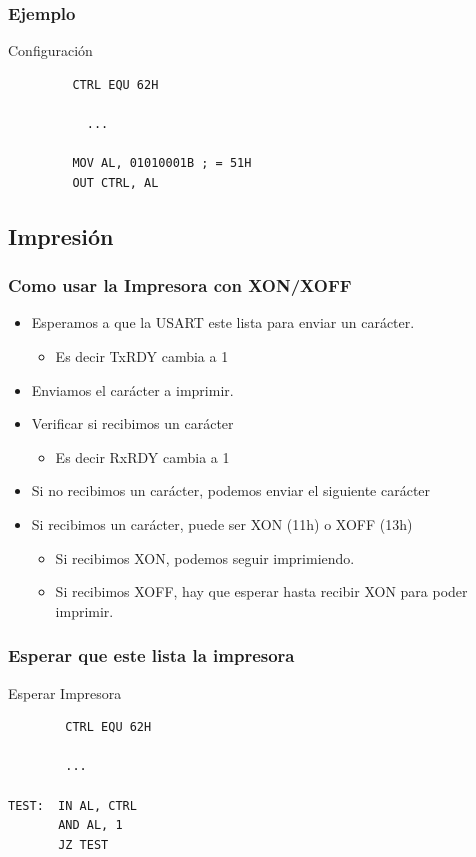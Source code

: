 \documentclass{beamer}
\begin{document}
\begin{frame}[fragile]
\frametitle{Ejemplo}
\begin{block}{Configuración}
 \begin{verbatim}
         CTRL EQU 62H
         
           ...
           
         MOV AL, 01010001B ; = 51H
         OUT CTRL, AL
 \end{verbatim}
\end{block}

\end{frame}

\subsection{Impresión}
\begin{frame}[fragile]
\frametitle{Como usar la Impresora con XON/XOFF}

\begin{itemize}
\item Esperamos a que la USART este lista para enviar un carácter. 
\begin{itemize}
\item Es decir TxRDY cambia a 1 
\end{itemize}
\item Enviamos el carácter a imprimir. 
\item Verificar si recibimos un carácter
\begin{itemize}
 \item Es decir RxRDY cambia a 1
\end{itemize}
\item Si no recibimos un carácter, podemos enviar el siguiente carácter
\item Si recibimos un carácter, puede ser XON (11h) o XOFF (13h)
\begin{itemize}
\item Si recibimos XON, podemos seguir imprimiendo.
\item Si recibimos XOFF, hay que esperar hasta recibir XON para poder imprimir.
\end{itemize}
\end{itemize}

\end{frame}

\begin{frame}[fragile]
\frametitle{Esperar que este lista la impresora}
\begin{block}{Esperar Impresora}
 \begin{verbatim}
        CTRL EQU 62H
         
        ...
           
TEST:  IN AL, CTRL
       AND AL, 1
       JZ TEST
             
 \end{verbatim}
\end{block}

\end{frame}
\end{document}
